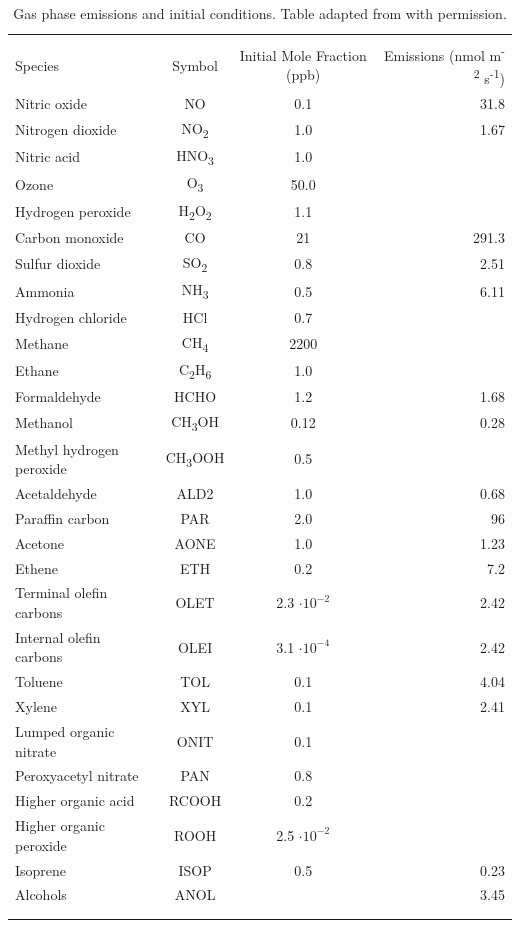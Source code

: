 \documentclass[acp, manuscript]{copernicus}
\begin{document}
\begin{table}[!t]
\centering
\caption{Gas phase emissions and initial conditions. Table adapted from \citet{riemer_simulating_2009} with permission.}
\begin{tabular*}{\linewidth}{@{\extracolsep{\fill}} lccr}
\\[-2ex]\hline 
     \hline \\[-2ex] Species & Symbol & Initial Mole Fraction (ppb) & Emissions (nmol m\textsuperscript{-2} s\textsuperscript{-1}) \\
\midrule
Nitric oxide & NO & 0.1 & 31.8 \\
Nitrogen dioxide & NO\textsubscript{2} & 1.0 & 1.67 \\
Nitric acid & HNO\textsubscript{3} & 1.0 & \\
Ozone & O\textsubscript{3} & 50.0 & \\
Hydrogen peroxide & H\textsubscript{2}O\textsubscript{2} & 1.1 & \\
Carbon monoxide & CO & 21 & 291.3 \\
Sulfur dioxide & SO\textsubscript{2} & 0.8 & 2.51 \\
Ammonia & NH\textsubscript{3} & 0.5 & 6.11 \\
Hydrogen chloride & HCl & 0.7 & \\
Methane & CH\textsubscript{4} & 2200 & \\
Ethane & C\textsubscript{2}H\textsubscript{6} & 1.0 & \\
Formaldehyde & HCHO & 1.2 & 1.68 \\
Methanol & CH\textsubscript{3}OH & 0.12 & 0.28 \\
Methyl hydrogen peroxide & CH\textsubscript{3}OOH & 0.5 & \\
Acetaldehyde & ALD2 & 1.0 & 0.68 \\
Paraffin carbon & PAR & 2.0 & 96 \\
Acetone & AONE & 1.0 & 1.23 \\
Ethene & ETH & 0.2 & 7.2 \\
Terminal olefin carbons & OLET & 2.3 \(\cdot 10^{-2}\) & 2.42 \\
Internal olefin carbons & OLEI & 3.1 \(\cdot 10^{-4}\) & 2.42 \\
Toluene & TOL & 0.1 & 4.04 \\
Xylene & XYL & 0.1 & 2.41 \\
Lumped organic nitrate & ONIT & 0.1 & \\
Peroxyacetyl nitrate & PAN & 0.8 & \\
Higher organic acid & RCOOH & 0.2 & \\
Higher organic peroxide & ROOH & 2.5 \(\cdot 10^{-2}\) & \\
Isoprene & ISOP & 0.5 & 0.23 \\
Alcohols & ANOL & & 3.45 \\
\\[-2ex]\hline 
     \hline \\[-2ex]
\end{tabular*}
\label{table:gas_emiss_ics}
\end{table}
\end{document}
